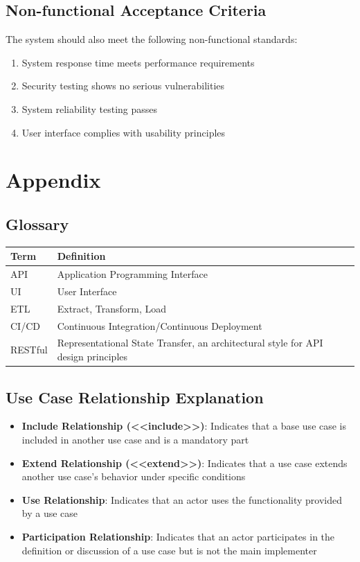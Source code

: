 \documentclass[a4paper,12pt]{article}
\begin{document}
\subsection{Non-functional Acceptance Criteria}

The system should also meet the following non-functional standards:

\begin{enumerate}
  \item System response time meets performance requirements
  \item Security testing shows no serious vulnerabilities
  \item System reliability testing passes
  \item User interface complies with usability principles
\end{enumerate}

\section{Appendix}

\subsection{Glossary}

\begin{longtable}{|p{3cm}|p{12cm}|}
\hline
\textbf{Term} & \textbf{Definition} \\
\hline
\endhead
API & Application Programming Interface \\
\hline
UI & User Interface \\
\hline
ETL & Extract, Transform, Load \\
\hline
CI/CD & Continuous Integration/Continuous Deployment \\
\hline
RESTful & Representational State Transfer, an architectural style for API design principles \\
\hline
\end{longtable}

\subsection{Use Case Relationship Explanation}

\begin{itemize}
  \item \textbf{Include Relationship (<<include>>)}: Indicates that a base use case is included in another use case and is a mandatory part
  \item \textbf{Extend Relationship (<<extend>>)}: Indicates that a use case extends another use case's behavior under specific conditions
  \item \textbf{Use Relationship}: Indicates that an actor uses the functionality provided by a use case
  \item \textbf{Participation Relationship}: Indicates that an actor participates in the definition or discussion of a use case but is not the main implementer
\end{itemize}
\end{document}
